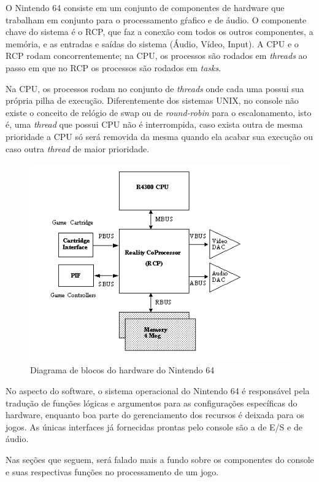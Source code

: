 \documentclass[12pt]{article}
\begin{document}
O Nintendo 64 consiste em um conjunto de componentes de hardware que
trabalham em conjunto para o processamento gŕafico e de áudio. O componente
chave do sistema é o RCP, que faz a conexão com todos os outros componentes, a memória, e as entradas e saídas do sistema (Áudio, Vídeo, Input). A CPU e o RCP rodam concorrentemente; na CPU, os processos são rodados em \textit{threads} ao passo em que no RCP os processos são rodados em
\textit{tasks}.

Na CPU, os processos rodam no conjunto de \textit{threads} onde cada uma
possui sua própria pilha de execução. Diferentemente dos sistemas UNIX,
no console não existe o conceito de relógio de swap ou de
\textit{round-robin} para o escalonamento, isto é, uma \textit{thread}
que possui CPU não é interrompida, caso exista outra de mesma prioridade
a CPU só será removida da mesma quando ela acabar sua execução ou caso
outra \textit{thread} de maior prioridade.

\begin{figure}[H]
    \label{fig:block-diagram}
    \centering
        \includegraphics[scale=.65]{figures/nintendo64-diagram}
    \caption{Diagrama de blocos do hardware do Nintendo 64}
\end{figure}

No aspecto do software, o sistema operacional do Nintendo 64 é responsável pela tradução de
funções lógicas e argumentos para as configurações específicas
do hardware, enquanto boa parte do gerenciamento dos recursos
é deixada para os jogos. As únicas interfaces já fornecidas prontas
pelo console são a de E/S e de áudio.

Nas seções que seguem, será falado mais a fundo sobre os componentes do
console e suas respectivas funções no processamento de um jogo.
\end{document}

